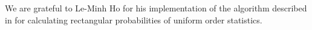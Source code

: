 We are grateful to Le-Minh Ho for his implementation of the algorithm
described in \citet{nieder81} for calculating rectangular probabilities
of uniform order statistics.






\address{Taylor B. Arnold \\
Yale University\\
24 Hillhouse Ave. \\
New Haven, CT 06511
USA\\
}

\address{John W. Emerson \\
Yale University\\
24 Hillhouse Ave. \\
New Haven, CT 06511
USA\\
}

